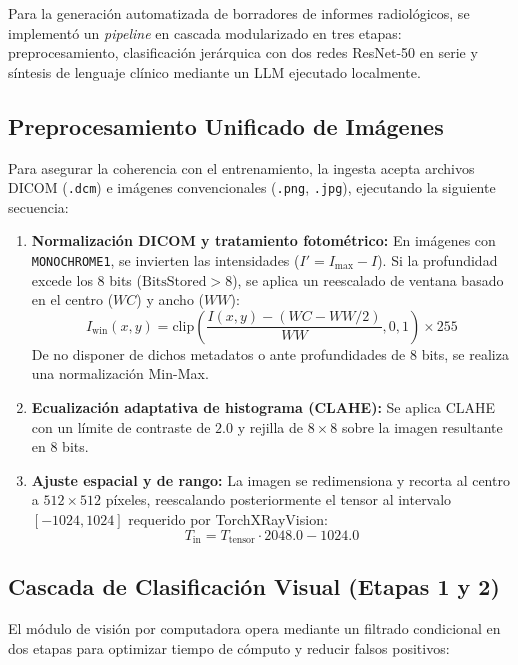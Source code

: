 \documentclass[../main.tex]{subfiles}
\begin{document}
Para la generación automatizada de borradores de informes radiológicos, se implementó un \textit{pipeline} en cascada modularizado en tres etapas: preprocesamiento, clasificación jerárquica con dos redes ResNet-50 en serie y síntesis de lenguaje clínico mediante un LLM ejecutado localmente.

\subsection{Preprocesamiento Unificado de Imágenes}
Para asegurar la coherencia con el entrenamiento, la ingesta acepta archivos DICOM (\texttt{.dcm}) e imágenes convencionales (\texttt{.png}, \texttt{.jpg}), ejecutando la siguiente secuencia:

\begin{enumerate}
    \item \textbf{Normalización DICOM y tratamiento fotométrico:} En imágenes con \texttt{MONOCHROME1}, se invierten las intensidades ($I' = I_{\max} - I$). Si la profundidad excede los 8 bits ($\text{BitsStored} > 8$), se aplica un reescalado de ventana basado en el centro ($WC$) y ancho ($WW$):
    \begin{equation}
        I_{\text{win}}(x,y) = \text{clip}\left( \frac{I(x,y) - (WC - WW/2)}{WW}, 0, 1 \right) \times 255
    \end{equation}
    De no disponer de dichos metadatos o ante profundidades de 8 bits, se realiza una normalización Min-Max.
    
    \item \textbf{Ecualización adaptativa de histograma (CLAHE):} Se aplica CLAHE con un límite de contraste de $2.0$ y rejilla de $8 \times 8$ sobre la imagen resultante en 8 bits.
    
    \item \textbf{Ajuste espacial y de rango:} La imagen se redimensiona y recorta al centro a $512 \times 512$ píxeles, reescalando posteriormente el tensor al intervalo $[-1024, 1024]$ requerido por TorchXRayVision:
    \begin{equation}
        T_{\text{in}} = T_{\text{tensor}} \cdot 2048.0 - 1024.0
    \end{equation}
\end{enumerate}

\subsection{Cascada de Clasificación Visual (Etapas 1 y 2)}
El módulo de visión por computadora opera mediante un filtrado condicional en dos etapas para optimizar tiempo de cómputo y reducir falsos positivos:
\end{document}
